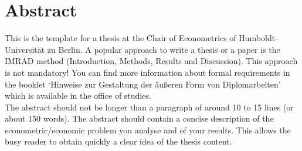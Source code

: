 \section*{Abstract}

This is the template for a thesis at the Chair of Econometrics of
Humboldt--Universit\"at zu Berlin. A popular approach to write a
thesis or a paper is the IMRAD method (Introduction, Methods,
Results and Discussion). This approach is not mandatory! You can
find more information about formal requirements in the booklet
`Hinweise zur Gestaltung der \"au\ss eren Form von Diplomarbeiten'
which is available in the office of studies.\\

The abstract should not be longer than a paragraph of around 10 to
15 lines (or about 150 words). The abstract should contain a
concise description of the econometric/economic problem you
analyse and of your results. This allows the busy reader to obtain
quickly a clear idea of the thesis content.
